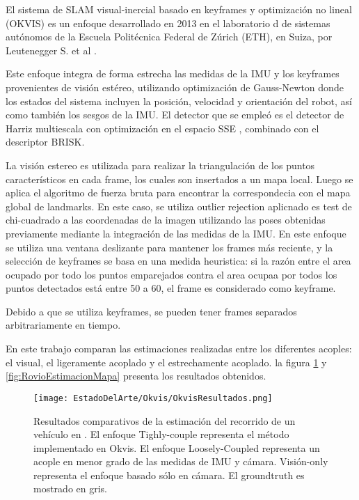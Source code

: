 El sistema de SLAM visual-inercial basado en keyframes y optimización no lineal (OKVIS)  es un enfoque desarrollado en 2013 en el laboratorio d de sistemas autónomos de la Escuela Politécnica Federal de Zúrich (ETH), en Suiza, por  Leutenegger S. et al \cite{okvis}.


Este enfoque integra de forma estrecha las medidas de la IMU y los keyframes provenientes de visión estéreo, utilizando optimización de Gauss-Newton donde los estados del sistema incluyen la posición, velocidad y orientación del robot, así como también los sesgos de la IMU. El detector que se empleó es el detector de Harriz multiescala con optimización en el espacio SSE , combinado con el descriptor BRISK. 

La visión estereo es utilizada para realizar la triangulación de los puntos característicos en cada frame, los cuales son insertados a un mapa local. Luego se aplica el algoritmo de fuerza bruta para encontrar la correspondecia con el mapa global de landmarks. En este caso, se utiliza outlier rejection aplicnado es test de chi-cuadrado a las coordenadas de la imagen utilizando las poses obtenidas previamente mediante la integración de las medidas de la IMU.
En este enfoque se utiliza una ventana deslizante para mantener los frames más reciente, y la selección de keyframes se basa en una medida heuristica: si la razón entre el area ocupado por todo los puntos emparejados contra el area ocupaa por todos los puntos detectados está entre 50 a 60, el frame es considerado como keyframe.

Debido a que se utiliza keyframes, se pueden tener frames separados arbitrariamente en tiempo. 

En este trabajo comparan las estimaciones realizadas entre los diferentes acoples: el visual, el ligeramente acoplado y el estrechamente acoplado. la figura \ref{fig:RovioEstimacion} y \ref{fig:RovioEstimacionMapa} presenta los resultados obtenidos.

\begin{figure}[H]
	\centering
	\texttt{[image: EstadoDelArte/Okvis/OkvisResultados.png]}
	\caption{Resultados comparativos de la estimación del recorrido de un vehículo  en . El enfoque Tighly-couple representa el método implementado en Okvis. El enfoque Loosely-Coupled representa un acople en menor grado de las medidas de IMU y cámara. Visión-only representa el enfoque basado sólo en cámara. El groundtruth es mostrado en gris.}
	\label{fig:RovioEstimacion}
\end{figure}


